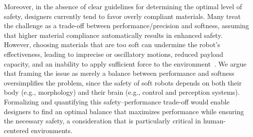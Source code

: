 Moreover, in the absence of clear guidelines for determining the optimal level of safety, designers currently tend to favor overly compliant materials. Many treat the challenge as a trade-off between performance/precision and softness, assuming that higher material compliance automatically results in enhanced safety. However, choosing materials that are too soft can undermine the robot’s effectiveness, leading to imprecise or oscillatory motions, reduced payload capacity, and an inability to apply sufficient force to the environment~\citep{iida2011soft, cianchetti2013stiff, mazzolai2022roadmap, majidi2014soft, hawkes2017soft}. We argue that framing the issue as merely a balance between performance and softness oversimplifies the problem, since the safety of soft robots depends on both their body (e.g., morphology) and their brain (e.g., control and perception systems). Formalizing and quantifying this safety–performance trade-off would enable designers to find an optimal balance that maximizes performance while ensuring the necessary safety, a consideration that is particularly critical in human-centered environments.

